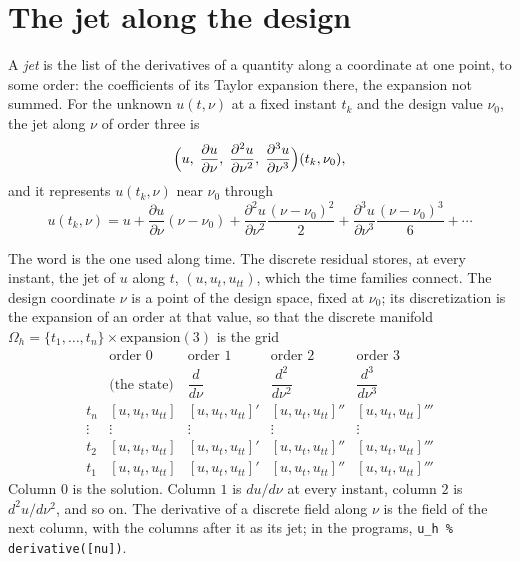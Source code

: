 
\section{The jet along the design}

A \emph{jet} is the list of the derivatives of a quantity along a
coordinate at one point, to some order: the coefficients of its
Taylor expansion there, the expansion not summed. For the unknown
$u(t, \nu)$ at a fixed instant $t_k$ and the design value $\nu_0$, the
jet along $\nu$ of order three is
\[
  \Bigl( u,\; \frac{\partial u}{\partial \nu},\;
         \frac{\partial^2 u}{\partial \nu^2},\;
         \frac{\partial^3 u}{\partial \nu^3} \Bigr)(t_k, \nu_0),
\]
and it represents $u(t_k, \nu)$ near $\nu_0$ through
\[
  u(t_k, \nu) = u + \frac{\partial u}{\partial \nu}(\nu - \nu_0)
  + \frac{\partial^2 u}{\partial \nu^2}\frac{(\nu - \nu_0)^2}{2}
  + \frac{\partial^3 u}{\partial \nu^3}\frac{(\nu - \nu_0)^3}{6} + \cdots
\]

The word is the one used along time. The discrete residual stores, at
every instant, the jet of $u$ along $t$, $(u, u_t, u_{tt})$, which the
time families connect. The design coordinate $\nu$ is a point of the
design space, fixed at $\nu_0$; its discretization is the expansion of
an order at that value, so that the discrete manifold
$\Omega_h = \{t_1, \ldots, t_n\} \times \mathrm{expansion}(3)$ is the
grid
\[
\begin{array}{c|cccc}
       & \text{order } 0 & \text{order } 1 & \text{order } 2 & \text{order } 3 \\
       & \text{(the state)} & \dfrac{d}{d\nu} & \dfrac{d^2}{d\nu^2} & \dfrac{d^3}{d\nu^3} \\[1ex]
\hline
  t_n  & [u, u_t, u_{tt}] & [u, u_t, u_{tt}]' & [u, u_t, u_{tt}]'' & [u, u_t, u_{tt}]''' \\
  \vdots & \vdots & \vdots & \vdots & \vdots \\
  t_2  & [u, u_t, u_{tt}] & [u, u_t, u_{tt}]' & [u, u_t, u_{tt}]'' & [u, u_t, u_{tt}]''' \\
  t_1  & [u, u_t, u_{tt}] & [u, u_t, u_{tt}]' & [u, u_t, u_{tt}]'' & [u, u_t, u_{tt}]'''
\end{array}
\]
Column $0$ is the solution. Column $1$ is $du/d\nu$ at every instant,
column $2$ is $d^2u/d\nu^2$, and so on. The derivative of a discrete
field along $\nu$ is the field of the next column, with the columns
after it as its jet; in the programs, \texttt{u\_h \% derivative([nu])}.

